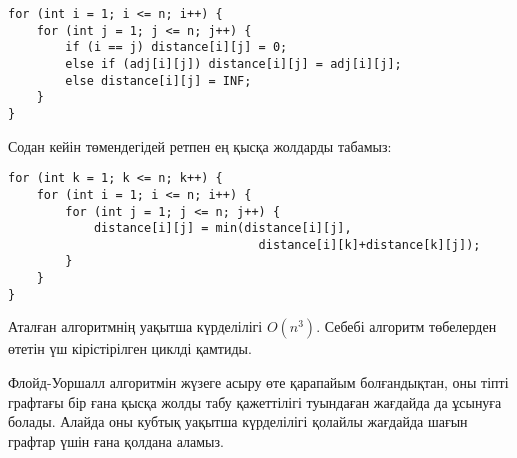 \begin{lstlisting}
for (int i = 1; i <= n; i++) {
    for (int j = 1; j <= n; j++) {
        if (i == j) distance[i][j] = 0;
        else if (adj[i][j]) distance[i][j] = adj[i][j];
        else distance[i][j] = INF;
    }
}
\end{lstlisting}
Содан кейін төмендегідей ретпен ең қысқа жолдарды табамыз: 
\begin{lstlisting}
for (int k = 1; k <= n; k++) {
    for (int i = 1; i <= n; i++) {
        for (int j = 1; j <= n; j++) {
            distance[i][j] = min(distance[i][j],
                                   distance[i][k]+distance[k][j]);
        }
    }
}
\end{lstlisting}

Аталған алгоритмнің уақытша күрделілігі $O(n^3)$. Себебі
алгоритм төбелерден өтетін үш кірістірілген 
циклді қамтиды.

Флойд-Уоршалл алгоритмін жүзеге асыру өте қарапайым 
болғандықтан, оны тіпті графтағы бір ғана қысқа жолды табу қажеттілігі туындаған жағдайда да ұсынуға болады. 
Алайда оны кубтық уақытша күрделілігі қолайлы жағдайда шағын графтар үшін ғана қолдана аламыз. 